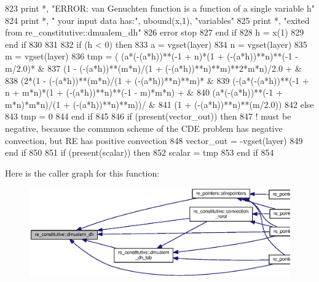 \begin{DoxyCode}
823           print *, \textcolor{stringliteral}{"ERROR: van Genuchten function is a function of a single variable h"}
824           print *, \textcolor{stringliteral}{"       your input data has:"}, ubound(x,1), \textcolor{stringliteral}{"variables"}
825           print *, \textcolor{stringliteral}{"exited from re\_constitutive::dmualem\_dh"}
826           error stop
827 \textcolor{keywordflow}{        end if}
828         h = x(1)
829 \textcolor{keywordflow}{      end if}
830       
831 
832       \textcolor{keywordflow}{if} (h < 0) \textcolor{keywordflow}{then}
833         a = vgset(layer)%
834         n = vgset(layer)%
835         m = vgset(layer)%
836         tmp = (    (a*(-(a*h))**(-1 + n)*(1 + (-(a*h))**n)**(-1 - m/2.0)* &
837             (1 - (-(a*h))**(m*n)/(1 + (-(a*h))**n)**m)**2*m*n)/2.0 + &
838          (2*(1 - (-(a*h))**(m*n)/(1 + (-(a*h))**n)**m)* &
839             (-(a*(-(a*h))**(-1 + n + m*n)*(1 + (-(a*h))**n)**(-1 - m)*m*n) + &
840               (a*(-(a*h))**(-1 + m*n)*m*n)/(1 + (-(a*h))**n)**m))/ &
841           (1 + (-(a*h))**n)**(m/2.0))
842       \textcolor{keywordflow}{else}
843         tmp = 0
844 \textcolor{keywordflow}{      end if}
845 
846       \textcolor{keywordflow}{if} (\textcolor{keyword}{present}(vector\_out)) \textcolor{keywordflow}{then}
847         \textcolor{comment}{! must be negative, because the commnon scheme of the CDE problem has negative convection, but RE
       has positive convection}
848         vector\_out = -vgset(layer)%
849 \textcolor{keywordflow}{      end if}
850 
851       \textcolor{keywordflow}{if} (\textcolor{keyword}{present}(scalar)) \textcolor{keywordflow}{then}
852         scalar = tmp
853 \textcolor{keywordflow}{      end if}
854 
\end{DoxyCode}


Here is the caller graph for this function\+:\nopagebreak
\begin{figure}[H]
\begin{center}
\leavevmode
\includegraphics[width=350pt]{namespacere__constitutive_a69e92c71f9859f011cbf34e28dc8922c_icgraph}
\end{center}
\end{figure}



